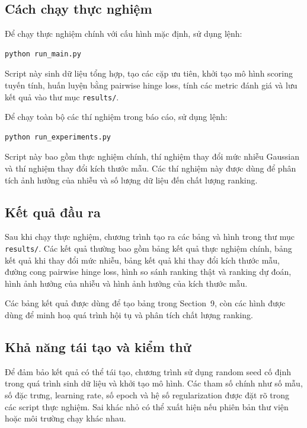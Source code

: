 \subsection{Cách chạy thực nghiệm}

Để chạy thực nghiệm chính với cấu hình mặc định, sử dụng lệnh:

\begin{lstlisting}[language=bash]
python run_main.py
\end{lstlisting}

Script này sinh dữ liệu tổng hợp, tạo các cặp ưu tiên, khởi tạo mô hình scoring tuyến tính, huấn luyện bằng pairwise hinge loss, tính các metric đánh giá và lưu kết quả vào thư mục \texttt{results/}.

Để chạy toàn bộ các thí nghiệm trong báo cáo, sử dụng lệnh:

\begin{lstlisting}[language=bash]
python run_experiments.py
\end{lstlisting}

Script này bao gồm thực nghiệm chính, thí nghiệm thay đổi mức nhiễu Gaussian và thí nghiệm thay đổi kích thước mẫu. Các thí nghiệm này được dùng để phân tích ảnh hưởng của nhiễu và số lượng dữ liệu đến chất lượng ranking.

\subsection{Kết quả đầu ra}

Sau khi chạy thực nghiệm, chương trình tạo ra các bảng và hình trong thư mục \texttt{results/}. Các kết quả thường bao gồm bảng kết quả thực nghiệm chính, bảng kết quả khi thay đổi mức nhiễu, bảng kết quả khi thay đổi kích thước mẫu, đường cong pairwise hinge loss, hình so sánh ranking thật và ranking dự đoán, hình ảnh hưởng của nhiễu và hình ảnh hưởng của kích thước mẫu.

Các bảng kết quả được dùng để tạo bảng trong Section~9, còn các hình được dùng để minh hoạ quá trình hội tụ và phân tích chất lượng ranking.

\subsection{Khả năng tái tạo và kiểm thử}

Để đảm bảo kết quả có thể tái tạo, chương trình sử dụng random seed cố định trong quá trình sinh dữ liệu và khởi tạo mô hình. Các tham số chính như số mẫu, số đặc trưng, learning rate, số epoch và hệ số regularization được đặt rõ trong các script thực nghiệm. Sai khác nhỏ có thể xuất hiện nếu phiên bản thư viện hoặc môi trường chạy khác nhau.

